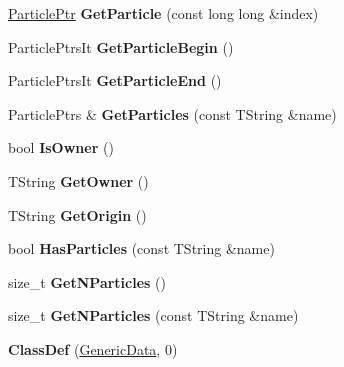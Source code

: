 \begin{DoxyCompactItemize}
\item 
\hypertarget{class_h_a_l_1_1_generic_data_a4956f4b4014bc1a7d32ad7399d622cba}{\hyperlink{class_h_a_l_1_1_generic_particle}{Particle\+Ptr} {\bfseries Get\+Particle} (const long long \&index)}\label{class_h_a_l_1_1_generic_data_a4956f4b4014bc1a7d32ad7399d622cba}

\item 
\hypertarget{class_h_a_l_1_1_generic_data_a601843b8bfda4d43a99cd46069b19d6c}{Particle\+Ptrs\+It {\bfseries Get\+Particle\+Begin} ()}\label{class_h_a_l_1_1_generic_data_a601843b8bfda4d43a99cd46069b19d6c}

\item 
\hypertarget{class_h_a_l_1_1_generic_data_a98b91768f0b886ac87611be8c7c490cd}{Particle\+Ptrs\+It {\bfseries Get\+Particle\+End} ()}\label{class_h_a_l_1_1_generic_data_a98b91768f0b886ac87611be8c7c490cd}

\item 
\hypertarget{class_h_a_l_1_1_generic_data_a88a50155c0cdc7dd76d681dcfb45dfc4}{Particle\+Ptrs \& {\bfseries Get\+Particles} (const T\+String \&name)}\label{class_h_a_l_1_1_generic_data_a88a50155c0cdc7dd76d681dcfb45dfc4}

\item 
\hypertarget{class_h_a_l_1_1_generic_data_a265c6f842139f2f7c8a12ff82962a15d}{bool {\bfseries Is\+Owner} ()}\label{class_h_a_l_1_1_generic_data_a265c6f842139f2f7c8a12ff82962a15d}

\item 
\hypertarget{class_h_a_l_1_1_generic_data_a444b2f7bd6c6e8ba6d585088f194928f}{T\+String {\bfseries Get\+Owner} ()}\label{class_h_a_l_1_1_generic_data_a444b2f7bd6c6e8ba6d585088f194928f}

\item 
\hypertarget{class_h_a_l_1_1_generic_data_a39aa41111f658bd66567068174a3c3be}{T\+String {\bfseries Get\+Origin} ()}\label{class_h_a_l_1_1_generic_data_a39aa41111f658bd66567068174a3c3be}

\item 
\hypertarget{class_h_a_l_1_1_generic_data_a05638e168b83e998c8d1c1b58cfef9d2}{bool {\bfseries Has\+Particles} (const T\+String \&name)}\label{class_h_a_l_1_1_generic_data_a05638e168b83e998c8d1c1b58cfef9d2}

\item 
\hypertarget{class_h_a_l_1_1_generic_data_a521637ed1d84af87cf0ef5432893576f}{size\+\_\+t {\bfseries Get\+N\+Particles} ()}\label{class_h_a_l_1_1_generic_data_a521637ed1d84af87cf0ef5432893576f}

\item 
\hypertarget{class_h_a_l_1_1_generic_data_a0d2533aa45faf37a56b820f2b3a0d7d5}{size\+\_\+t {\bfseries Get\+N\+Particles} (const T\+String \&name)}\label{class_h_a_l_1_1_generic_data_a0d2533aa45faf37a56b820f2b3a0d7d5}

\item 
\hypertarget{class_h_a_l_1_1_generic_data_a737f93b6a0d228a7a7b8146cf6e151ea}{{\bfseries Class\+Def} (\hyperlink{class_h_a_l_1_1_generic_data}{Generic\+Data}, 0)}\label{class_h_a_l_1_1_generic_data_a737f93b6a0d228a7a7b8146cf6e151ea}

\end{DoxyCompactItemize}
